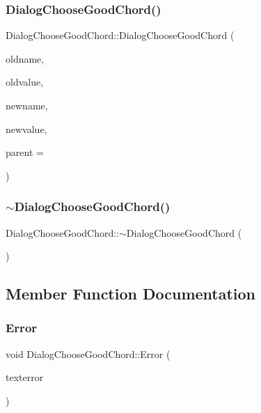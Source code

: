\subsubsection{Dialog\+Choose\+Good\+Chord()}
{\footnotesize\ttfamily Dialog\+Choose\+Good\+Chord\+::\+Dialog\+Choose\+Good\+Chord (\begin{DoxyParamCaption}\item[{Q\+String}]{oldname,  }\item[{Q\+String}]{oldvalue,  }\item[{Q\+String}]{newname,  }\item[{Q\+String}]{newvalue,  }\item[{Q\+Widget $\ast$}]{parent = {} }\end{DoxyParamCaption})\hspace{0.3cm}{\ttfamily [explicit]}}

\mbox{\label{class_dialog_choose_good_chord_aa43c9d54cf25dfc64c477eca63ac79dd}} 
\subsubsection{$\sim$\+Dialog\+Choose\+Good\+Chord()}
{\footnotesize\ttfamily Dialog\+Choose\+Good\+Chord\+::$\sim$\+Dialog\+Choose\+Good\+Chord (\begin{DoxyParamCaption}{ }\end{DoxyParamCaption})}



\subsection{Member Function Documentation}
\mbox{\label{class_dialog_choose_good_chord_ae1efce45018b1515df4e7d136b7fbad7}} 
\subsubsection{Error}
{\footnotesize\ttfamily void Dialog\+Choose\+Good\+Chord\+::\+Error (\begin{DoxyParamCaption}\item[{Q\+String}]{texterror }\end{DoxyParamCaption})\hspace{0.3cm}{\ttfamily [signal]}}

